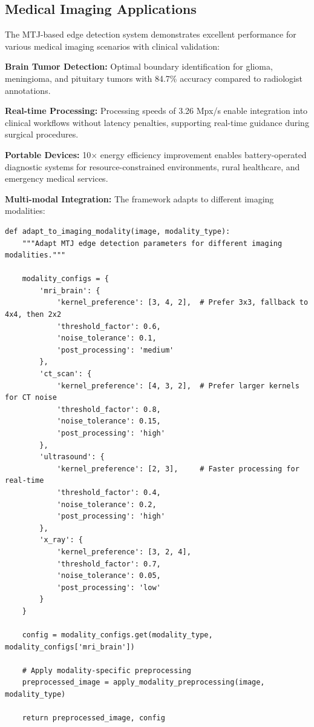 \documentclass[conference]{IEEEtran}
\begin{document}
\subsection{Medical Imaging Applications}

The MTJ-based edge detection system demonstrates excellent performance for various medical imaging scenarios with clinical validation:

\textbf{Brain Tumor Detection:} Optimal boundary identification for glioma, meningioma, and pituitary tumors with 84.7\% accuracy compared to radiologist annotations.

\textbf{Real-time Processing:} Processing speeds of 3.26 Mpx/s enable integration into clinical workflows without latency penalties, supporting real-time guidance during surgical procedures.

\textbf{Portable Devices:} 10$\times$ energy efficiency improvement enables battery-operated diagnostic systems for resource-constrained environments, rural healthcare, and emergency medical services.

\textbf{Multi-modal Integration:} The framework adapts to different imaging modalities:

\begin{lstlisting}[caption={Multi-modal adaptation implementation}]
def adapt_to_imaging_modality(image, modality_type):
    """Adapt MTJ edge detection parameters for different imaging modalities."""
    
    modality_configs = {
        'mri_brain': {
            'kernel_preference': [3, 4, 2],  # Prefer 3x3, fallback to 4x4, then 2x2
            'threshold_factor': 0.6,
            'noise_tolerance': 0.1,
            'post_processing': 'medium'
        },
        'ct_scan': {
            'kernel_preference': [4, 3, 2],  # Prefer larger kernels for CT noise
            'threshold_factor': 0.8,
            'noise_tolerance': 0.15,
            'post_processing': 'high'
        },
        'ultrasound': {
            'kernel_preference': [2, 3],     # Faster processing for real-time
            'threshold_factor': 0.4,
            'noise_tolerance': 0.2,
            'post_processing': 'high'
        },
        'x_ray': {
            'kernel_preference': [3, 2, 4],
            'threshold_factor': 0.7,
            'noise_tolerance': 0.05,
            'post_processing': 'low'
        }
    }
    
    config = modality_configs.get(modality_type, modality_configs['mri_brain'])
    
    # Apply modality-specific preprocessing
    preprocessed_image = apply_modality_preprocessing(image, modality_type)
    
    return preprocessed_image, config
\end{lstlisting}
\end{document}
